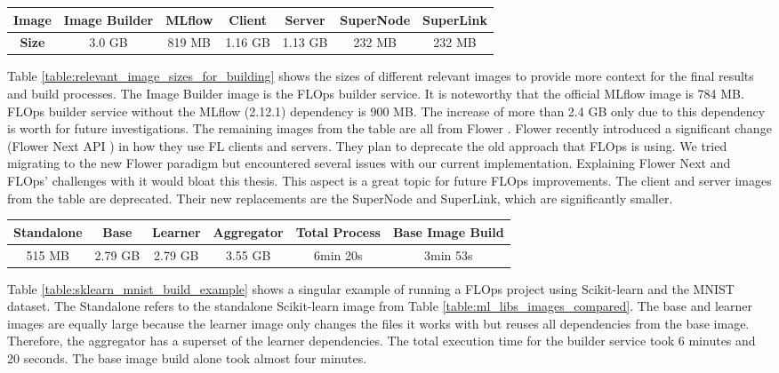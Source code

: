 \begin{changemargin}{0cm}{0cm}
    \centering
    \begin{tabular}{|c||c|c|c|c|c|c|}
        \hline
            \textbf{Image} & Image Builder & MLflow & Client & Server & SuperNode & SuperLink \\
        \hline
            \textbf{Size} & 3.0 GB & 819 MB & 1.16 GB & 1.13 GB & 232 MB & 232 MB
        \\
        \hline
    \end{tabular}
    \label{table:relevant_image_sizes_for_building}
\end{changemargin}
Table \ref{table:relevant_image_sizes_for_building} shows the sizes of different relevant images to provide more context for the final results and build processes.
The Image Builder image is the FLOps builder service.
It is noteworthy that the official MLflow image is 784 MB.
FLOps builder service without the MLflow (2.12.1) dependency is 900 MB.
The increase of more than 2.4 GB only due to this dependency is worth for future investigations.
The remaining images from the table are all from Flower \cite{flower_images}.
Flower recently introduced a significant change (Flower Next API \cite{docs:flower_next}) in how they use FL clients and servers.
They plan to deprecate the old approach that FLOps is using.
We tried migrating to the new Flower paradigm but encountered several issues with our current implementation.
Explaining Flower Next and FLOps' challenges with it would bloat this thesis.
This aspect is a great topic for future FLOps improvements.
The client and server images from the table are deprecated.
Their new replacements are the SuperNode and SuperLink, which are significantly smaller.

\begin{changemargin}{0cm}{0cm}
    \centering
    \begin{tabular}{|c|c|c|c|c|c|}
        \hline
            \textbf{Standalone} & \textbf{Base} & \textbf{Learner} & \textbf{Aggregator} & \textbf{Total Process} & \textbf{Base Image Build} \\
        \hline
            515 MB & 2.79 GB & 2.79 GB & 3.55 GB & 6min 20s & 3min 53s
        \\
        \hline
    \end{tabular}
    \label{table:sklearn_mnist_build_example}
\end{changemargin}
Table \ref{table:sklearn_mnist_build_example} shows a singular example of running a FLOps project using Scikit-learn and the MNIST dataset.
The Standalone refers to the standalone Scikit-learn image from Table \ref{table:ml_libs_images_compared}.
The base and learner images are equally large because the learner image only changes the files it works with but reuses all dependencies from the base image.
Therefore, the aggregator has a superset of the learner dependencies.
The total execution time for the builder service took 6 minutes and 20 seconds.
The base image build alone took almost four minutes.


